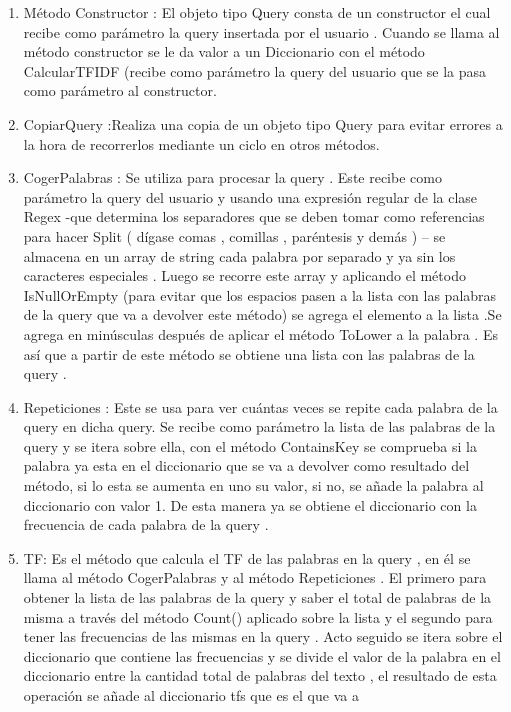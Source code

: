 \documentclass[10pt]{extarticle}
\begin{document}
\begin{enumerate}
	\item Método Constructor : El objeto tipo Query consta de un constructor el cual recibe como parámetro la query insertada 
	por el usuario . Cuando se llama al método constructor se le da valor a un Diccionario con el 
	método CalcularTFIDF (recibe como parámetro la 	query del usuario que se la pasa como parámetro al constructor. 
	\item  CopiarQuery :Realiza una copia de un objeto tipo Query para 	evitar errores a la hora de recorrerlos mediante un ciclo en otros métodos. 
	\item CogerPalabras : Se utiliza para procesar la query  . Este recibe como parámetro la query 
	del usuario y usando una expresión regular de la clase Regex -que determina los separadores que 
	se deben tomar como referencias para hacer Split ( dígase comas , comillas , paréntesis y demás ) 
	– se almacena en un array de string cada palabra por separado y ya sin los caracteres especiales . 
	Luego se recorre este array y aplicando el método IsNullOrEmpty (para evitar que los espacios 
	pasen a la lista con las palabras de la query que va a devolver este método) se agrega el elemento 
	a la lista .Se agrega en minúsculas después de aplicar el método ToLower a la palabra . Es así que a 
	partir de este método se obtiene una lista con las palabras de la query . 
	\item  Repeticiones : Este se usa para ver cuántas veces se repite cada palabra de la 
	query en dicha query. Se recibe como parámetro la lista de las palabras de la query y se itera sobre 
	ella, con el método ContainsKey se comprueba si la palabra ya esta en el diccionario que se va a devolver como resultado del método, 
	si lo esta se aumenta en uno su valor, si no, se añade la palabra al diccionario con valor 1. De esta 
	manera ya se obtiene el diccionario con la frecuencia de cada palabra de la query . 
    \item TF:	Es el método que calcula el TF de las palabras en la query , en él se llama al método CogerPalabras y al 
	método Repeticiones . El primero para obtener la lista de las palabras de la query y saber el total 
	de palabras de la misma a través del método Count() aplicado sobre la lista y el segundo para 
	tener las frecuencias de las mismas en la query . Acto seguido se itera sobre el diccionario que 
	contiene las frecuencias y se divide el valor de la palabra en el diccionario entre la cantidad total 
	de palabras del texto , el resultado de esta operación se añade al diccionario tfs que es el que va a 

\end{enumerate}
\end{document}
